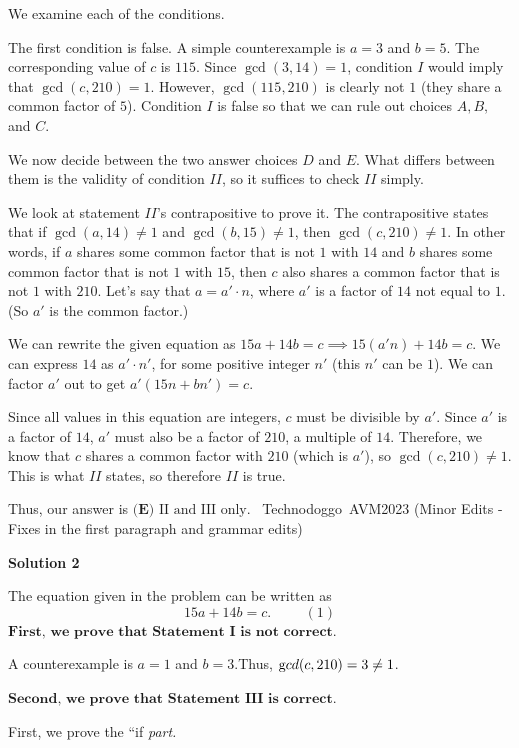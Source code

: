 \begin{enumerate}
We examine each of the conditions. 

 The first condition is false. A simple counterexample is $a=3$ and $b=5$. The corresponding value of $c$ is $115$. Since $\gcd(3,14)=1$, condition $I$ would imply that $\gcd(c,210)=1.$ However, $\gcd(115,210)$ is clearly not $1$ (they share a common factor of $5$). Condition $I$ is false so that we can rule out choices $A,B,$ and $C$. 

 We now decide between the two answer choices $D$ and $E$. What differs between them is the validity of condition $II$, so it suffices to check $II$ simply. 

 We look at statement $II$'s contrapositive to prove it. The contrapositive states that if $\gcd(a,14)\neq1$ and $\gcd(b,15)\neq1$, then $\gcd(c,210)\neq1.$ In other words, if $a$ shares some common factor that is not $1$ with $14$ and $b$ shares some common factor that is not $1$ with $15$, then $c$ also shares a common factor that is not $1$ with $210$. Let's say that $a=a'\cdot n$, where $a'$ is a factor of $14$ not equal to $1$. (So $a'$ is the common factor.) 

 We can rewrite the given equation as $15a+14b=c\implies15(a'n)+14b=c.$ We can express $14$ as $a'\cdot n'$, for some positive integer $n'$ (this $n'$ can be $1$). We can factor $a'$ out to get $a'(15n+bn')=c.$ 

 Since all values in this equation are integers, $c$ must be divisible by $a'$. Since $a'$ is a factor of $14$, $a'$ must also be a factor of $210$, a multiple of $14$. Therefore, we know that $c$ shares a common factor with $210$ (which is $a'$), so $\gcd(c,210)\neq1$. This is what $II$ states, so therefore $II$ is true. 

 Thus, our answer is $\boxed{\textbf{(E) }\text{II and III only}}.$ ~Technodoggo~AVM2023 (Minor Edits - Fixes in the first paragraph and grammar edits)

 



\textbf{Solution 2}

The equation given in the problem can be written as
 \[ 15 a + 14 b = c. \hspace{1cm} (1) \]
$\textbf{First, we prove that Statement I is not correct.}$

 A counterexample is $a = 1$ and $b = 3$.Thus, ${\textrm gcd} (c, 210) = 3 \neq 1$.

 $\textbf{Second, we prove that Statement III is correct.}$

 First, we prove the ``if\textit{ part. }


\end{enumerate}
